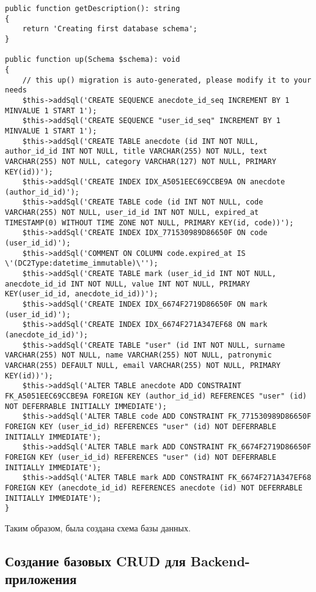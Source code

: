 \documentclass[pract]{SCWorks}
\begin{document}
\begin{verbatim}
public function getDescription(): string
{
    return 'Creating first database schema';
}

public function up(Schema $schema): void
{
    // this up() migration is auto-generated, please modify it to your needs
    $this->addSql('CREATE SEQUENCE anecdote_id_seq INCREMENT BY 1 MINVALUE 1 START 1');
    $this->addSql('CREATE SEQUENCE "user_id_seq" INCREMENT BY 1 MINVALUE 1 START 1');
    $this->addSql('CREATE TABLE anecdote (id INT NOT NULL, author_id_id INT NOT NULL, title VARCHAR(255) NOT NULL, text VARCHAR(255) NOT NULL, category VARCHAR(127) NOT NULL, PRIMARY KEY(id))');
    $this->addSql('CREATE INDEX IDX_A5051EEC69CCBE9A ON anecdote (author_id_id)');
    $this->addSql('CREATE TABLE code (id INT NOT NULL, code VARCHAR(255) NOT NULL, user_id_id INT NOT NULL, expired_at TIMESTAMP(0) WITHOUT TIME ZONE NOT NULL, PRIMARY KEY(id, code))');
    $this->addSql('CREATE INDEX IDX_771530989D86650F ON code (user_id_id)');
    $this->addSql('COMMENT ON COLUMN code.expired_at IS \'(DC2Type:datetime_immutable)\'');
    $this->addSql('CREATE TABLE mark (user_id_id INT NOT NULL, anecdote_id_id INT NOT NULL, value INT NOT NULL, PRIMARY KEY(user_id_id, anecdote_id_id))');
    $this->addSql('CREATE INDEX IDX_6674F2719D86650F ON mark (user_id_id)');
    $this->addSql('CREATE INDEX IDX_6674F271A347EF68 ON mark (anecdote_id_id)');
    $this->addSql('CREATE TABLE "user" (id INT NOT NULL, surname VARCHAR(255) NOT NULL, name VARCHAR(255) NOT NULL, patronymic VARCHAR(255) DEFAULT NULL, email VARCHAR(255) NOT NULL, PRIMARY KEY(id))');
    $this->addSql('ALTER TABLE anecdote ADD CONSTRAINT FK_A5051EEC69CCBE9A FOREIGN KEY (author_id_id) REFERENCES "user" (id) NOT DEFERRABLE INITIALLY IMMEDIATE');
    $this->addSql('ALTER TABLE code ADD CONSTRAINT FK_771530989D86650F FOREIGN KEY (user_id_id) REFERENCES "user" (id) NOT DEFERRABLE INITIALLY IMMEDIATE');
    $this->addSql('ALTER TABLE mark ADD CONSTRAINT FK_6674F2719D86650F FOREIGN KEY (user_id_id) REFERENCES "user" (id) NOT DEFERRABLE INITIALLY IMMEDIATE');
    $this->addSql('ALTER TABLE mark ADD CONSTRAINT FK_6674F271A347EF68 FOREIGN KEY (anecdote_id_id) REFERENCES anecdote (id) NOT DEFERRABLE INITIALLY IMMEDIATE');
}
\end{verbatim}

Таким образом, была создана схема базы данных.

\subsection{Создание базовых CRUD для Backend-приложения}
\end{document}

